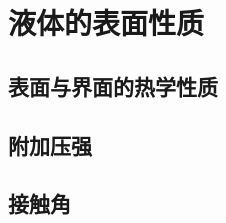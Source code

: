 

\section{液体的表面性质}\label{12-4}

\subsection{表面与界面的热学性质}\label{12-4-1}

\subsection{附加压强}\label{12-4-2}

\subsection{接触角}\label{12-4-3}